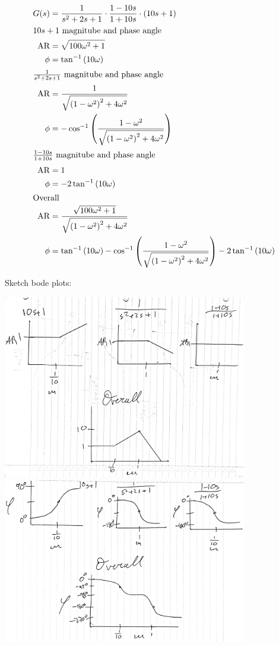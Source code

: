 \documentclass[12pt]{article}
\begin{document}
\begin{enumerate}
    \begin{align*}
        G(s) &= \frac{1}{s^2 + 2s + 1} \cdot \frac{1-10s}{1+10s} \cdot (10s+1)\\
        \intertext{$10s+1$ magnitube and phase angle}
        \text{AR} &= \sqrt{100\omega^2+1} \\
        \phi &= \tan^{-1}\left(10\omega\right) \\
        \intertext{$\frac{1}{s^2 + 2s + 1}$ magnitube and phase angle}
        \text{AR} &= \frac{1}{\sqrt{\left(1-\omega^2\right)^2 + 4\omega^2}} \\
        \phi &= -\cos^{-1}\left(\frac{1-\omega^2}{\sqrt{\left(1-\omega^2\right)^2 + 4\omega^2}}\right) \\
        \intertext{$\frac{1-10s}{1+10s}$ magnitube and phase angle}
        \text{AR} &= 1 \\
        \phi &= -2\tan^{-1}\left(10\omega\right) \\
        \intertext{Overall}
        \text{AR} &= \frac{\sqrt{100\omega^2+1}}{\sqrt{\left(1-\omega^2\right)^2 + 4\omega^2}} \\
        \phi &= \tan^{-1}\left(10\omega\right) - \cos^{-1}\left(\frac{1-\omega^2}{\sqrt{\left(1-\omega^2\right)^2 + 4\omega^2}}\right) - 2\tan^{-1}\left(10\omega\right) \\
    \end{align*}

    Sketch bode plots:

    \begin{center}
        \includegraphics[width=0.8\textwidth]{assets/iii_mag.jpg}
        \includegraphics[width=0.8\textwidth]{assets/iii_phase.jpg}
    \end{center}


\end{enumerate}
\end{document}
